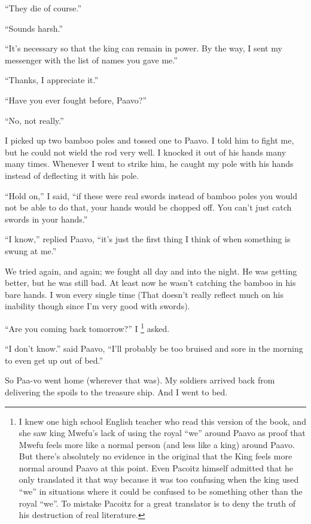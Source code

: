 ``They die of course.''

``Sounds harsh.''

``It's necessary so that the king can remain in power. By the way, I sent my messenger with the list of names you gave me.''

``Thanks, I appreciate it.''

``Have you ever fought before, Paa\-vo?''

``No, not really.''

I picked up two bamboo poles and tossed one to Paa\-vo. I told him to fight me, but he could not wield the rod very well. I knocked it out of his hands many many times. Whenever I went to strike him, he caught my pole with his hands instead of deflecting it with his pole.

``Hold on,'' I said, ``if these were real swords instead of bamboo poles you would not be able to do that, your hands would be chopped off. You can't just catch swords in your hands.''

``I know,'' replied Paa\-vo, ``it's just the first thing I think of when something is swung at me.''

We tried again, and again; we fought all day and into the night. He was getting better, but he was still bad. At least now he wasn't catching the bamboo in his bare hands. I won every single time (That doesn't really reflect much on his inability though since I'm very good with swords).

``Are you coming back tomorrow?'' I
\footnote{I knew one high school English teacher who read this version of the book, and she saw king Mwe\-fu's lack of using the royal ``we'' around Paa\-vo as proof that Mwe\-fu feels more like a normal person (and less like a king) around Paa\-vo.
But there's absolutely no evidence in the original that the King feels more normal around Paa\-vo at this point. 
Even Pa\-co\-itz himself admitted that he only translated it that way because it was too confusing when the king used ``we'' in situations where it could be confused to be something other than the royal ``we''. To mistake Pa\-co\-itz for a great translator is to deny the truth of his destruction of real literature.
} asked.

``I don't know.'' said Paa\-vo, ``I'll probably be too bruised and sore in the morning to even get up out of bed.''

So Paa-vo went home (wherever that was). My soldiers arrived back from delivering the spoils to the treasure ship. And I went to bed.
